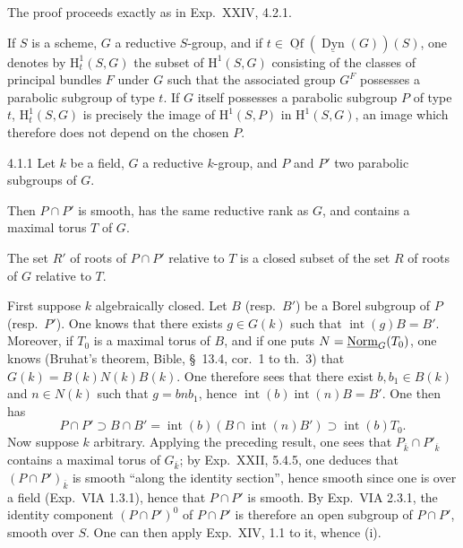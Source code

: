 The proof proceeds exactly as in Exp.~XXIV, 4.2.1.

\label{XXVI.3.21}
If $S$ is a scheme, $G$ a reductive $S$-group, and if $t\in\underline{\operatorname{Of}}(\underline{\operatorname{Dyn}}(G))(S)$, one denotes by $\mathrm H^1_t(S,G)$ the subset of $\mathrm H^1(S,G)$ consisting of the classes of principal bundles $F$ under $G$ such that the associated group $G^F$ possesses a parabolic subgroup of type $t$. If $G$ itself possesses a parabolic subgroup $P$ of type $t$, $\mathrm H^1_t(S,G)$ is precisely the image of $\mathrm H^1(S,P)$ in $\mathrm H^1(S,G)$, an image which therefore does not depend on the chosen $P$.

\begin{lemma}{4.1.1}\label{XXVI.4.1.1}
Let $k$ be a field, $G$ a reductive $k$-group, and $P$ and $P'$ two parabolic subgroups of $G$.
\begin{enumeratei}
\item Then $P\cap P'$ is smooth, has the same reductive rank as $G$, and contains a maximal torus $T$ of $G$.
\item The set $R'$ of roots of $P\cap P'$ relative to $T$ is a closed subset of the set $R$ of roots of $G$ relative to $T$.
\end{enumeratei}
\end{lemma}
First suppose $k$ algebraically closed. Let $B$ (resp.~$B'$) be a Borel subgroup of $P$ (resp.~$P'$). One knows that there exists $g\in G(k)$ such that $\operatorname{int}(g)B=B'$. Moreover, if $T_0$ is a maximal torus of $B$, and if one puts $N=\underline{\mathrm{Norm}}_G(T_0)$, one knows (Bruhat's theorem, Bible, \S~13.4, cor.~1 to th.~3) that $G(k)=B(k)N(k)B(k)$. One therefore sees that there exist $b,b_1\in B(k)$ and $n\in N(k)$ such that $g=bnb_1$, hence $\operatorname{int}(b)\operatorname{int}(n)B=B'$. One then has
\[
P\cap P'\supset B\cap B'=\operatorname{int}(b)(B\cap\operatorname{int}(n)B')\supset\operatorname{int}(b)T_0.
\]
Now suppose $k$ arbitrary. Applying the preceding result, one sees that $P_{\overline k}\cap P'_{\overline k}$ contains a maximal torus of $G_{\overline k}$; by Exp.~XXII, 5.4.5, one deduces that $(P\cap P')_{\overline k}$ is smooth ``along the identity section'', hence smooth since one is over a field (Exp.~VIA 1.3.1), hence that $P\cap P'$ is smooth. By Exp.~VIA 2.3.1, the identity component $(P\cap P')^0$ of $P\cap P'$ is therefore an open subgroup of $P\cap P'$, smooth over $S$. One can then apply Exp.~XIV, 1.1 to it, whence (i).

